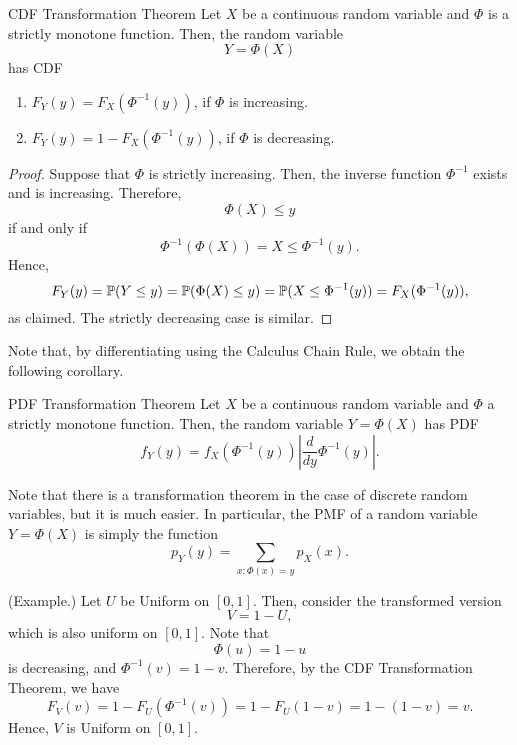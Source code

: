 \begin{theorem}{CDF Transformation Theorem}{}
    Let $X$ be a continuous random variable and $\Phi$ is a strictly monotone function. Then, the random variable 
    \[Y = \Phi(X)\]
    has CDF
    \begin{enumerate}
        \item $F_{Y}(y) = F_{X}(\Phi^{-1}(y))$, if $\Phi$ is increasing. 
        \item $F_{Y}(y) = 1 - F_{X}(\Phi^{-1}(y))$, if $\Phi$ is decreasing. 
    \end{enumerate}
\end{theorem}
\begin{mdframed}[]
    \begin{proof}
        Suppose that $\Phi$ is strictly increasing. Then, the inverse function $\Phi^{-1}$ exists and is increasing. Therefore, \[\Phi(X) \leq y\] if and only if \[\Phi^{-1}(\Phi(X)) = X \leq \Phi^{-1}(y).\] Hence, \[F_{Y}(y) = \mathbb{P}(Y \leq y) = \mathbb{P}(\Phi(X) \leq y) = \mathbb{P}(X \leq \Phi^{-1}(y)) = F_{X}(\Phi^{-1}(y)),\] as claimed. The strictly decreasing case is similar. 
    \end{proof}
\end{mdframed}
Note that, by differentiating using the Calculus Chain Rule, we obtain the following corollary. 

\begin{corollary}{PDF Transformation Theorem}{}
    Let $X$ be a continuous random variable and $\Phi$ a strictly monotone function. Then, the random variable $Y = \Phi(X)$ has PDF
    \[f_{Y}(y) = f_{X}(\Phi^{-1}(y)) \left|\frac{d}{dy} \Phi^{-1}(y)\right|.\]
\end{corollary}
Note that there is a transformation theorem in the case of discrete random variables, but it is much easier. In particular, the PMF of a random variable $Y = \Phi(X)$ is simply the function 
\[p_{Y}(y) = \sum_{x: \Phi(x) = y} p_{X}(x).\]

\begin{mdframed}[]
    (Example.) Let $U$ be Uniform on $[0, 1]$. Then, consider the transformed version \[V = 1 - U,\] which is also uniform on $[0, 1]$. Note that \[\Phi(u) = 1 - u\] is decreasing, and $\Phi^{-1}(v) = 1 - v$. Therefore, by the CDF Transformation Theorem, we have 
    \[F_{V}(v) = 1 - F_{U}(\Phi^{-1}(v)) = 1 - F_{U}(1 - v) = 1 - (1 - v) = v.\]
    Hence, $V$ is Uniform on $[0, 1]$. 
\end{mdframed}


